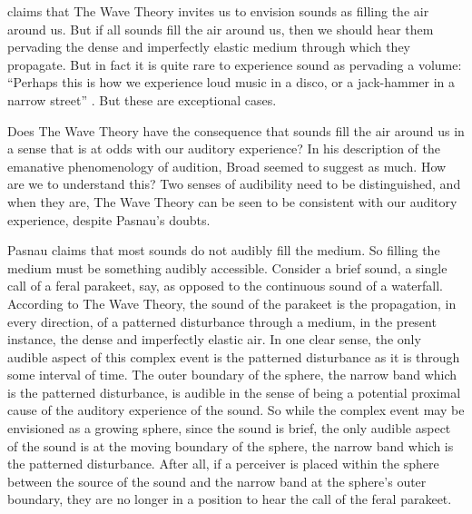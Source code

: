 \citet[section 6]{Pasnau:1999ss} claims that The Wave Theory invites us to envision sounds as filling the air around us. But if all sounds fill the air around us, then we should hear them pervading the dense and imperfectly elastic medium through which they propagate. But in fact it is quite rare to experience sound as pervading a volume: ``Perhaps this is how we experience loud music in a disco, or a jack-hammer in a narrow street'' \citep[312]{Pasnau:1999ss}. But these are exceptional cases.

Does The Wave Theory have the consequence that sounds fill the air around us in a sense that is at odds with our auditory experience? In his description of the emanative phenomenology of audition, Broad seemed to suggest as much. How are we to understand this? Two senses of audibility need to be distinguished, and when they are, The Wave Theory can be seen to be consistent with our auditory experience, despite Pasnau's doubts.

Pasnau claims that most sounds do not audibly fill the medium. So filling the medium must be something audibly accessible. Consider a brief sound, a single call of a feral parakeet, say, as opposed to the continuous sound of a waterfall. According to The Wave Theory, the sound of the parakeet is the propagation, in every direction, of a patterned disturbance through a medium, in the present instance, the dense and imperfectly elastic air. In one clear sense, the only audible aspect of this complex event is the patterned disturbance as it is through some interval of time. The outer boundary of the sphere, the narrow band which is the patterned disturbance, is audible in the sense of being a potential proximal cause of the auditory experience of the sound. So while the complex event may be envisioned as a growing sphere, since the sound is brief, the only audible aspect of the sound is at the moving boundary of the sphere, the narrow band which is the patterned disturbance. After all, if a perceiver is placed within the sphere between the source of the sound and the narrow band at the sphere's outer boundary, they are no longer in a position to hear the call of the feral parakeet. 

